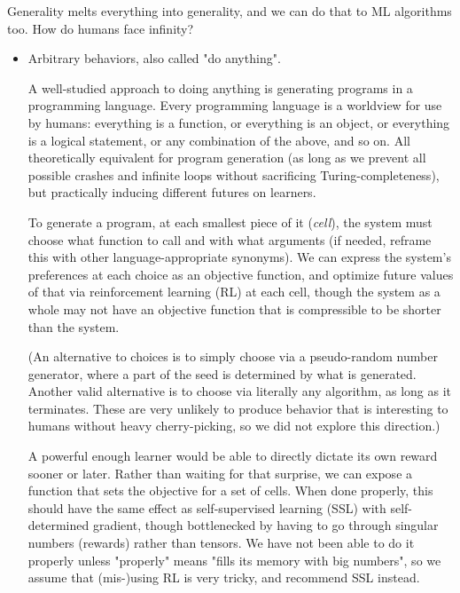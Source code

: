 \documentclass{article}
\begin{document}
Generality melts everything into generality, and we can do that to ML algorithms too. How do humans face infinity?

\begin{itemize}
\item Arbitrary behaviors, also called "do anything".

A well-studied approach to doing anything is generating programs in a programming language. Every programming language is a worldview for use by humans: everything is a function, or everything is an object, or everything is a logical statement, or any combination of the above, and so on. All theoretically equivalent for program generation (as long as we prevent all possible crashes and infinite loops without sacrificing Turing-completeness), but practically inducing different futures on learners.

To generate a program, at each smallest piece of it (\textit{cell}), the system must choose what function to call and with what arguments (if needed, reframe this with other language-appropriate synonyms). We can express the system's preferences at each choice as an objective function, and optimize future values of that via reinforcement learning (RL) at each cell, though the system as a whole may not have an objective function that is compressible to be shorter than the system.

(An alternative to choices is to simply choose via a pseudo-random number generator, where a part of the seed is determined by what is generated. Another valid alternative is to choose via literally any algorithm, as long as it terminates. These are very unlikely to produce behavior that is interesting to humans without heavy cherry-picking, so we did not explore this direction.)

A powerful enough learner would be able to directly dictate its own reward sooner or later. Rather than waiting for that surprise, we can expose a function that sets the objective for a set of cells. When done properly, this should have the same effect as self-supervised learning (SSL) with self-determined gradient, though bottlenecked by having to go through singular numbers (rewards) rather than tensors. We have not been able to do it properly unless "properly" means "fills its memory with big numbers", so we assume that (mis-)using RL is very tricky, and recommend SSL instead.


\end{itemize}
\end{document}
